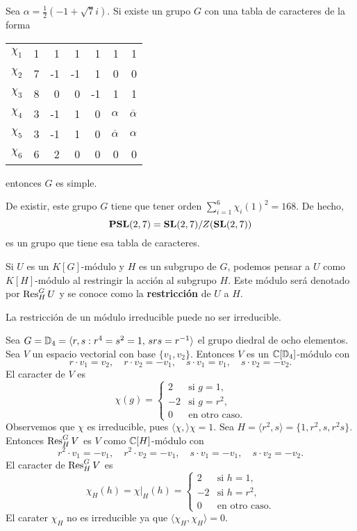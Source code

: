 \begin{example}
    Sea $\alpha=\frac{1}{2}(-1+\sqrt{7}i)$. 
    Si existe un grupo $G$ con una tabla de caracteres de la forma
    \begin{center}
		\begin{tabular}{|c|rrrrrr|}
			\hline
			$\chi_{1}$ & 1 & 1 & 1 & 1 & 1 & 1\tabularnewline
			$\chi_{2}$ & 7 & -1 & -1 & 1 & 0 & 0 \tabularnewline
			$\chi_{3}$ & 8 & 0 & 0 & -1 & 1 & 1\tabularnewline
		    $\chi_{4}$ & 3 & -1 & 1 & 0 & $\alpha$ & $\overline{\alpha}$ \tabularnewline
			$\chi_{5}$ & 3 & -1 & 1 & 0 & $\overline{\alpha}$ & $\alpha$\tabularnewline
			$\chi_{6}$ & 6 & 2 & 0 & 0 & 0 & 0\tabularnewline
			\hline
		\end{tabular}
	\end{center}    
	entonces $G$ es simple. 
	
	De existir, este grupo $G$ tiene que tener
	orden $\sum_{i=1}^6\chi_i(1)^2=168$. 
	De hecho, 
	\[
	\mathbf{PSL}(2,7)=\mathbf{SL}(2,7)/Z(\mathbf{SL}(2,7))
	\]
	es un grupo que 
	tiene esa tabla de caracteres.
\end{example}

\begin{definition}
Si $U$ es un $K[G]$-módulo y $H$ es un subgrupo de $G$, podemos pensar a $U$ como $K[H]$-módulo al restringir la acción
al subgrupo $H$. Este módulo será denotado por $\operatorname{Res}_H^GU$ y se conoce como la \textbf{restricción} de $U$ a $H$.
\end{definition}

La restricción de un módulo irreducible puede no ser irreducible. 

\begin{example}
    Sea $G=\mathbb{D}_4=\langle r,s:r^4=s^2=1,\,srs=r^{-1}\rangle$ el grupo diedral de ocho elementos. Sea
    $V$ un espacio vectorial con base $\{v_1,v_2\}$. Entonces $V$ es un $\mathbb{C}[\mathbb{D}_4]$-módulo con 
    \[
    r\cdot v_1=v_2,\quad
    r\cdot v_2=-v_1,\quad
    s\cdot v_1=v_1,\quad
    s\cdot v_2=-v_2.
    \]
    El caracter de $V$ es 
    \[
    \chi(g)=\begin{cases}
    2 & \text{si $g=1$},\\
    -2 & \text{si $g=r^2$},\\
    0 & \text{en otro caso}.
    \end{cases}
    \]
    Observemos que $\chi$ es irreducible, pues $\langle\chi,\rangle\chi=1$.
    Sea 
    $H=\langle r^2,s\rangle=\{1,r^2,s,r^2s\}$. Entonces $\operatorname{Res}_H^GV$ es $V$ como $\mathbb{C}[H]$-módulo con
    \[
    r^2\cdot v_1=-v_1,\quad
    r^2\cdot v_2=-v_1,\quad
    s\cdot v_1=-v_1,\quad
    s\cdot v_2=-v_2.
    \]
    El caracter de $\operatorname{Res}_H^GV$ es
    \[
    \chi_H(h)=\chi|_H(h)
    =\begin{cases}
    2 & \text{si $h=1$},\\
    -2 & \text{si $h=r^2$},\\
    0 & \text{en otro caso}.
    \end{cases}
    \]
    El carater $\chi_H$ no es irreducible ya que $\langle\chi_H,\chi_H\rangle=0$. 
\end{example}

